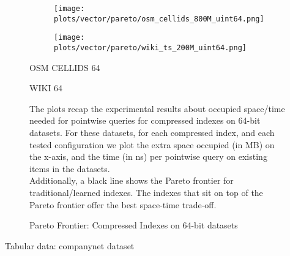 \documentclass{article}
\begin{document}
\begin{figure}[!htbp]
{\begin{minipage}[t][0.98\textheight][t]{\textwidth}
    \begin{minipage}{0.48\linewidth}
        \begin{figure}[H]
        \texttt{[image: plots/vector/pareto/osm\_cellids\_800M\_uint64.png]}
        \end{figure}
    \end{minipage}
    \begin{minipage}{0.48\linewidth}
        \begin{figure}[H]
        \texttt{[image: plots/vector/pareto/wiki\_ts\_200M\_uint64.png]}
        \end{figure}
    \end{minipage}
    \begin{minipage}{0.48\linewidth}
    \begin{center}
        OSM CELLIDS 64
    \end{center}
    \end{minipage}
    \begin{minipage}{0.48\linewidth}
    \begin{center}
        WIKI 64
    \end{center}
    \end{minipage}

    \vfill
    
    \begin{minipage}{\linewidth}
        The plots recap the experimental results about occupied space/time needed for pointwise queries for compressed indexes on 64-bit datasets. For these datasets, for each compressed index, and each tested configuration we plot the extra space occupied (in MB) on the x-axis, and the time (in ns) per pointwise query on existing items in the datasets. \\

    Additionally, a black line shows the Pareto frontier for traditional/learned indexes. The indexes that sit on top of the Pareto frontier offer the best space-time trade-off. 
            \end{minipage}
    \vspace{10px}
\end{minipage}
}
\caption{Pareto Frontier: Compressed Indexes on 64-bit datasets}
\end{figure}

\clearpage

\begin{table}[t]

\caption{Tabular data: companynet dataset}
\end{table}
\end{document}
